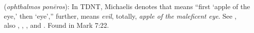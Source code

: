 \item[Maleficent eye,]

(\textit{ophthalmos ponēros}):
In TDNT, Michaelis denotes that  means ``first `apple of the eye,' then `eye','' 
 further,  means \emph{evil}, totally, \emph{apple of the maleficent eye}. See , also , , , and .
Found in Mark 7:22.
